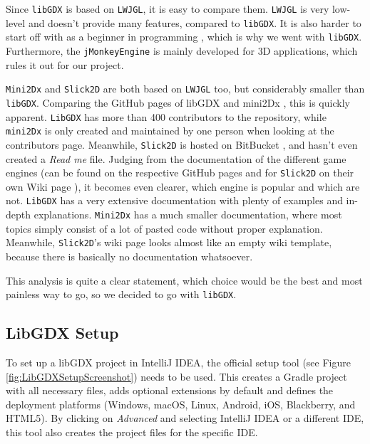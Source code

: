 \documentclass[12p]{article}
\begin{document}
Since \texttt{libGDX} is based on \texttt{LWJGL}, it is easy to compare them. \texttt{LWJGL} is very low-level and doesn't provide many features, compared to \texttt{libGDX}. It is also harder to start off with as a beginner in programming \cite{StackExchangeLibGDXLWJGL}, which is why we went with \texttt{libGDX}. Furthermore, the \texttt{jMonkeyEngine} is mainly developed for 3D applications, which rules it out for our project. 

\texttt{Mini2Dx} and \texttt{Slick2D} are both based on \texttt{LWJGL} too, but considerably smaller than \texttt{libGDX}. Comparing the GitHub pages of libGDX \cite{libgDXGitHub} and mini2Dx \cite{mini2DxGitHub}, this is quickly apparent. \texttt{LibGDX} has more than 400 contributors to the repository, while \texttt{mini2Dx} is only created and maintained by one person when looking at the contributors page. Meanwhile, \texttt{Slick2D} is hosted on BitBucket \cite{Slick2DBitBucket}, and hasn't even created a \emph{Read me} file. Judging from the documentation of the different game engines (can be found on the respective GitHub pages and for \texttt{Slick2D} on their own Wiki page \cite{Slick2DWiki}), it becomes even clearer, which engine is popular and which are not. \texttt{LibGDX} has a very extensive documentation with plenty of examples and in-depth explanations. \texttt{Mini2Dx} has a much smaller documentation, where most topics simply consist of a lot of pasted code without proper explanation. Meanwhile, \texttt{Slick2D}'s wiki page looks almost like an empty wiki template, because there is basically no documentation whatsoever.

This analysis is quite a clear statement, which choice would be the best and most painless way to go, so we decided to go with \texttt{libGDX}.


\newpage
\subsection{LibGDX Setup} \label{DocSetup}

To set up a libGDX project in IntelliJ IDEA, the official setup tool (see Figure \ref{fig:LibGDXSetupScreenshot}) needs to be used. This creates a Gradle project with all necessary files, adds optional extensions by default and defines the deployment platforms (Windows, macOS, Linux, Android, iOS, Blackberry, and HTML5). By clicking on \emph{Advanced} and selecting IntelliJ IDEA or a different IDE, this tool also creates the project files for the specific IDE.
\end{document}
